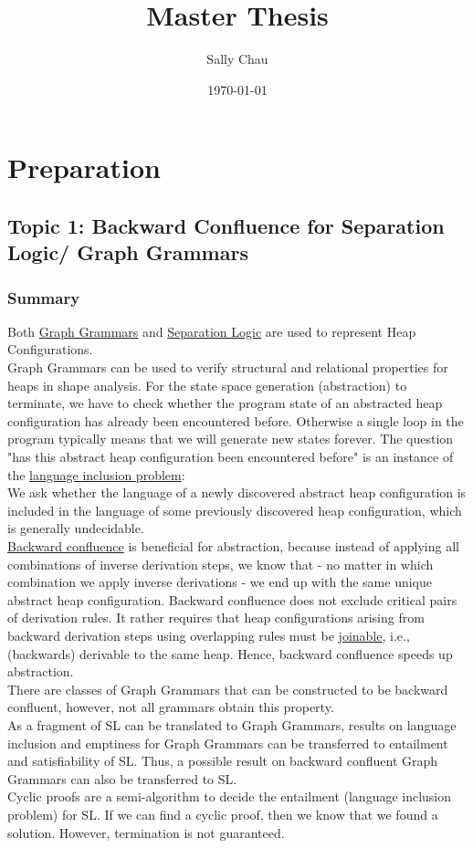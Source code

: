 \documentclass[a4paper,12pt]{article}
\title{Master Thesis}
\date{\today}
\author{Sally Chau}
\begin{document}
\maketitle
\tableofcontents

\section{Preparation}

\subsection{Topic 1: Backward Confluence for Separation Logic/ Graph Grammars}

\subsubsection{Summary}
Both \ul{Graph Grammars} and \ul{Separation Logic} are used to represent Heap
Configurations.\\
Graph Grammars can be used to verify structural and relational properties
for heaps in shape analysis. For the state space generation (abstraction) to terminate, we have to check whether the program state of an abstracted heap configuration has already been encountered before. Otherwise a single loop in the program typically means that we will generate new states forever.
The question "has this abstract heap configuration been encountered before" is an instance of the \ul{language inclusion problem}:\\
We ask whether the language of a newly discovered abstract heap configuration
is included in the language of some previously discovered heap configuration, which is generally undecidable.\\
\ul{Backward confluence} is beneficial for abstraction, because instead of
applying all combinations of inverse derivation steps, we know that - no
matter in which combination we apply inverse derivations - we end up with the
same unique abstract heap configuration. Backward confluence does not exclude critical pairs of derivation rules. It rather requires that heap configurations arising from backward derivation steps using overlapping rules must be \ul{joinable}, i.e.,
(backwards) derivable to the same heap. Hence, backward confluence speeds up abstraction.\\
There are classes of Graph Grammars that can be constructed to be backward confluent, however, not all grammars obtain this property. \\
As a fragment of SL can be translated to Graph Grammars, results on
language inclusion and emptiness for Graph Grammars can be transferred to
entailment and satisfiability of SL. Thus, a possible result on backward
confluent Graph Grammars can also be transferred to SL.\\
Cyclic proofs are a semi-algorithm to decide the entailment (language inclusion problem) for SL. If we can find a cyclic proof, then we know that we found a solution. However, termination is not guaranteed.  
\end{document}
